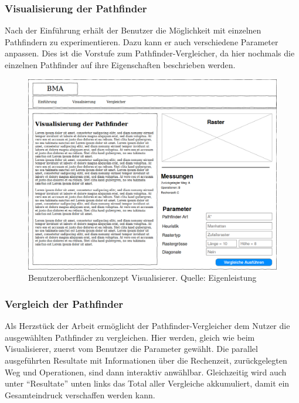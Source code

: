 \documentclass[12pt,a4paper,german]{report}
\begin{document}
\subsubsection{Visualisierung der Pathfinder}
Nach der Einführung erhält der Benutzer die Möglichkeit mit einzelnen Pathfindern zu experimentieren. Dazu kann er auch verschiedene Parameter anpassen. Dies ist die Vorstufe zum Pathfinder-Vergleicher, da hier nochmals die einzelnen Pathfinder auf ihre Eigenschaften beschrieben werden.
\begin{figure}[h]
  \centering
  \includegraphics[width=16cm]{visualisierung1}
  \caption[Benutzeroberflächenkonzept des Pathfinding-Visualisierers.]{Benutzeroberflächenkonzept Visualisierer. Quelle: Eigenleistung}
  \label{fig:gui_konzept_visualizer}
\end{figure}

\clearpage

\subsubsection{Vergleich der Pathfinder}
Als Herzstück der Arbeit ermöglicht der Pathfinder-Vergleicher dem Nutzer die ausgewählten Pathfinder zu vergleichen. Hier werden, gleich wie beim Visualisierer, zuerst vom Benutzer die Parameter gewählt. Die parallel ausgeführten Resultate mit Informationen über die Rechenzeit, zurückgelegten Weg und Operationen, sind dann interaktiv anwählbar. Gleichzeitig wird auch unter ``Resultate'' unten links das Total aller Vergleiche akkumuliert, damit ein Gesamteindruck verschaffen werden kann.
\end{document}
